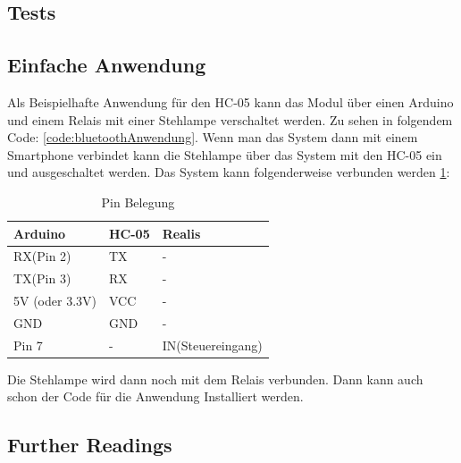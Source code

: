 \begin{code}[H]
	\caption{Code zur Überprüfung der Funktionalität}
	\label{code:bluetoothEinfach}
\end{code}


\subsection{Tests}

\subsection{Einfache Anwendung}
Als Beispielhafte Anwendung für den HC-05 kann das Modul über einen Arduino und einem Relais mit einer Stehlampe verschaltet  werden. Zu sehen in folgendem Code: \ref{code:bluetoothAnwendung}. Wenn man das System dann mit einem Smartphone verbindet kann die Stehlampe über das System mit den HC-05 ein und ausgeschaltet werden. Das System kann folgenderweise verbunden werden \ref{tab:Pin Belegung}: 
\begin{table}[h]
	\centering
	\caption{Pin Belegung}
	\begin{tabular}{|l|l|l|}
		\textbf{Arduino} & \textbf{HC-05} & \textbf{Realis}\\ \hline
		RX(Pin 2) 		 & 		TX 		  &        -       \\ \hline
		TX(Pin 3)		 &		RX		  &		   -	   \\ \hline
		5V (oder 3.3V)   &		VCC		  &		   -	   \\ \hline
		GND				 &		GND		  &		   -       \\ \hline
		Pin 7			 &       -		  &IN(Steuereingang)\\ \hline
	\end{tabular}
	\label{tab:Pin Belegung}
\end{table}

Die Stehlampe wird dann noch mit dem Relais verbunden. Dann kann auch schon der Code für die Anwendung Installiert werden.

\begin{code}[H]
	\caption{Code zur Überprüfung der Funktionalität}
	\label{code:bluetoothAnwendung}
\end{code}
		 


\subsection{Further Readings}














